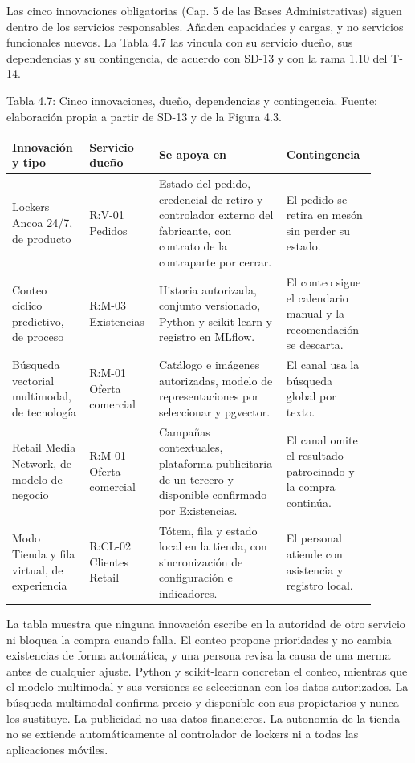 \documentclass[11pt]{article}
\begin{document}
Las cinco innovaciones obligatorias (Cap. 5 de las Bases Administrativas) siguen dentro de los servicios responsables. Añaden capacidades y cargas, y no servicios funcionales nuevos. La Tabla 4.7 las vincula con su servicio dueño, sus dependencias y su contingencia, de acuerdo con SD-13 y con la rama 1.10 del T-14.

\par\vspace{0pt plus 10\baselineskip}\vspace{0pt plus -10\baselineskip}

Tabla 4.7: Cinco innovaciones, dueño, dependencias y contingencia. Fuente: elaboración propia a partir de SD-13 y de la Figura 4.3.\par\nopagebreak
\begin{longtable}{@{}p{0.2\linewidth}p{0.15\linewidth}p{0.33\linewidth}p{0.22\linewidth}@{}}
\toprule Innovación y tipo & Servicio dueño & Se apoya en & Contingencia \\
\midrule\endhead\bottomrule\endlastfoot
Lockers Ancoa 24/7, de producto & R:V-01 Pedidos & Estado del pedido, credencial de retiro y controlador externo del fabricante, con contrato de la contraparte por cerrar. & El pedido se retira en mesón sin perder su estado. \\
Conteo cíclico predictivo, de proceso & R:M-03 Existencias & Historia autorizada, conjunto versionado, Python y scikit-learn y registro en MLflow. & El conteo sigue el calendario manual y la recomendación se descarta. \\
Búsqueda vectorial multimodal, de tecnología & R:M-01 Oferta comercial & Catálogo e imágenes autorizadas, modelo de representaciones por seleccionar y pgvector. & El canal usa la búsqueda global por texto. \\
Retail Media Network, de modelo de negocio & R:M-01 Oferta comercial & Campañas contextuales, plataforma publicitaria de un tercero y disponible confirmado por Existencias. & El canal omite el resultado patrocinado y la compra continúa. \\
Modo Tienda y fila virtual, de experiencia & R:CL-02 Clientes Retail & Tótem, fila y estado local en la tienda, con sincronización de configuración e indicadores. & El personal atiende con asistencia y registro local. \\
\end{longtable}

La tabla muestra que ninguna innovación escribe en la autoridad de otro servicio ni bloquea la compra cuando falla. El conteo propone prioridades y no cambia existencias de forma automática, y una persona revisa la causa de una merma antes de cualquier ajuste. Python y scikit-learn concretan el conteo, mientras que el modelo multimodal y sus versiones se seleccionan con los datos autorizados. La búsqueda multimodal confirma precio y disponible con sus propietarios y nunca los sustituye. La publicidad no usa datos financieros. La autonomía de la tienda no se extiende automáticamente al controlador de lockers ni a todas las aplicaciones móviles.
\end{document}
